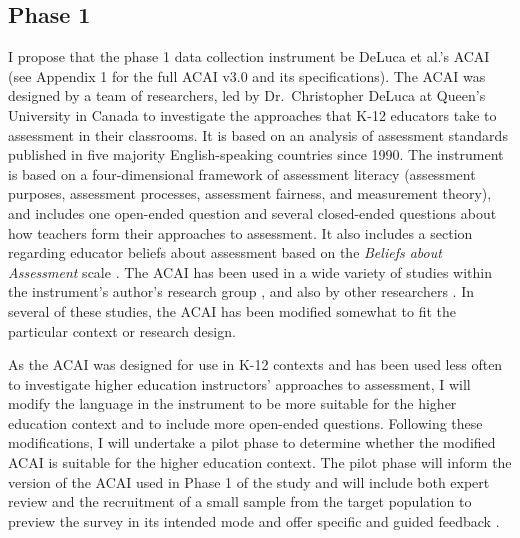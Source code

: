 \documentclass[
]{book}
\begin{document}
\hypertarget{phase-1}{%
\subsection*{Phase 1}\label{phase-1}}

I propose that the phase 1 data collection instrument be DeLuca et al.'s \citeyearpar{delucaApproachesClassroomAssessment2016} ACAI (see Appendix 1 for the full ACAI v3.0 and its specifications). The ACAI was designed by a team of researchers, led by Dr.~Christopher DeLuca at Queen's University in Canada to investigate the approaches that K-12 educators take to assessment in their classrooms. It is based on an analysis of assessment standards published in five majority English-speaking countries since 1990. The instrument is based on a four-dimensional framework of assessment literacy (assessment purposes, assessment processes, assessment fairness, and measurement theory), and includes one open-ended question and several closed-ended questions about how teachers form their approaches to assessment. It also includes a section regarding educator beliefs about assessment based on the \emph{Beliefs about Assessment} scale \citep{smithPreparingTeachersUse2014}. The ACAI has been used in a wide variety of studies within the instrument's author's research group \citep{coombsChangingApproachesClassroom2018, coombsPersoncenteredAnalysisTeacher2020, delucaDifferentialSituatedView2019, delucaTeachersApproachesClassroom2016, delucaPoliciesProgramsPractices2019, schneiderLinkingPersonalityTeachers2020}, and also by other researchers \citep{nayaginPreserviceTeachersApproaches2020}. In several of these studies, the ACAI has been modified somewhat to fit the particular context or research design.

As the ACAI was designed for use in K-12 contexts and has been used less often to investigate higher education instructors' approaches to assessment, I will modify the language in the instrument to be more suitable for the higher education context and to include more open-ended questions. Following these modifications, I will undertake a pilot phase to determine whether the modified ACAI is suitable for the higher education context. The pilot phase will inform the version of the ACAI used in Phase 1 of the study and will include both expert review and the recruitment of a small sample from the target population to preview the survey in its intended mode and offer specific and guided feedback \citep{hibbertsCommonSurveySampling2012, rencklyAirUniversitySampling2002}.
\end{document}
